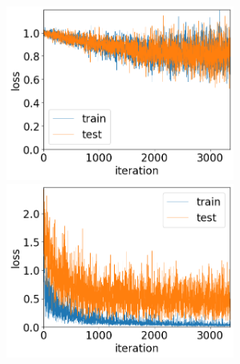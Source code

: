 \documentclass[11pt,a4paper,uplatex,draft]{ujarticle}
\begin{document}
  \begin{figure}[htbp]
    \begin{minipage}[b]{0.5\textwidth}
      \centering
      \includegraphics[keepaspectratio, width=75mm]{Images/python/loss_202402052108.png}
    \end{minipage}
    \begin{minipage}[b]{0.5\textwidth}
      \centering
      \includegraphics[keepaspectratio, width=75mm]{Images/python/loss_202402052149.png}
    \end{minipage}
  \end{figure}
  \clearpage
\end{document}

